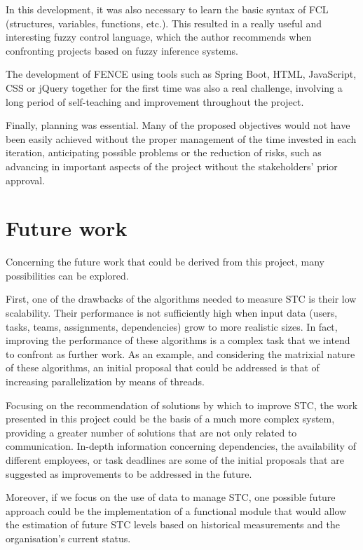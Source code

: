 In this development, it was also necessary to learn the basic syntax of FCL (structures, variables, functions, etc.). This resulted in a really useful and interesting fuzzy control language, which the author recommends when confronting projects based on fuzzy inference systems.

The development of FENCE using tools such as Spring Boot, HTML, JavaScript, CSS or jQuery together for the first time was also a real challenge, involving a long period of self-teaching and improvement throughout the project.

Finally, planning was essential. Many of the proposed objectives would not have been easily achieved without the proper management of the time invested in each iteration,   anticipating possible problems or the reduction of risks, such as advancing in important aspects of the project without the stakeholders’ prior approval.

\section{Future work}

Concerning the future work that could be derived from this project, many possibilities can be explored.

First, one of the drawbacks of the algorithms needed to measure STC is their low scalability. Their performance is not sufficiently high when input data (users, tasks, teams, assignments, dependencies) grow to more realistic sizes. In fact, improving the performance of these algorithms is a complex task that we intend to confront as further work. As an example, and considering the matrixial nature of these algorithms, an initial proposal that could be addressed is that of increasing parallelization by means of threads.

Focusing on the recommendation of solutions by which to improve STC, the work presented in this project could be the basis of a much more complex system, providing a greater number of solutions that are not only related to communication. In-depth information concerning dependencies, the availability of different employees, or task deadlines are some of the initial proposals that are suggested as improvements to be addressed in the future.

Moreover, if we focus on the use of data to manage STC, one possible future approach could be the implementation of a functional module that would allow the estimation of future STC levels based on historical measurements and the organisation’s current status.

